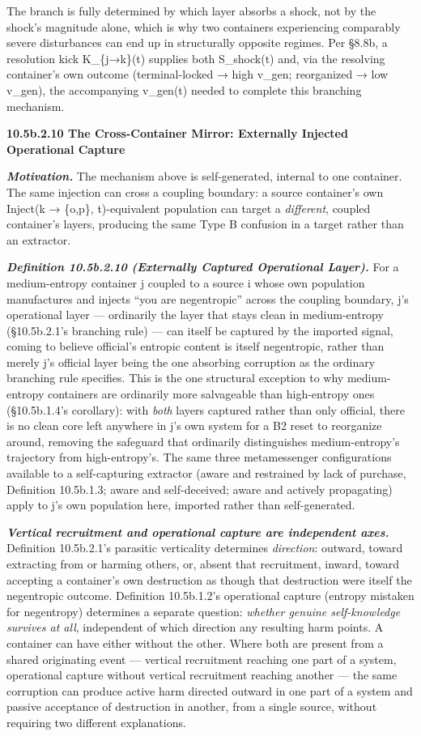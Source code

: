 \documentclass[
]{article}
\begin{document}
The branch is fully determined by which layer absorbs a shock, not by
the shock's magnitude alone, which is why two containers experiencing
comparably severe disturbances can end up in structurally opposite
regimes. Per §8.8b, a resolution kick K\_\{j→k\}(t) supplies both
S\_shock(t) and, via the resolving container's own outcome
(terminal-locked → high v\_gen; reorganized → low v\_gen), the
accompanying v\_gen(t) needed to complete this branching mechanism.

\textbf{10.5b.2.10 The Cross-Container Mirror: Externally Injected
Operational Capture}

\emph{\textbf{Motivation.}} The mechanism above is self-generated,
internal to one container. The same injection can cross a coupling
boundary: a source container's own Inject(k → \{o,p\}, t)-equivalent
population can target a \emph{different}, coupled container's layers,
producing the same Type B confusion in a target rather than an
extractor.

\emph{\textbf{Definition 10.5b.2.10 (Externally Captured Operational
Layer).}} For a medium-entropy container j coupled to a source i whose
own population manufactures and injects ``you are negentropic'' across
the coupling boundary, j's operational layer --- ordinarily the layer
that stays clean in medium-entropy (§10.5b.2.1's branching rule) --- can
itself be captured by the imported signal, coming to believe official's
entropic content is itself negentropic, rather than merely j's official
layer being the one absorbing corruption as the ordinary branching rule
specifies. This is the one structural exception to why medium-entropy
containers are ordinarily more salvageable than high-entropy ones
(§10.5b.1.4's corollary): with \emph{both} layers captured rather than
only official, there is no clean core left anywhere in j's own system
for a B2 reset to reorganize around, removing the safeguard that
ordinarily distinguishes medium-entropy's trajectory from
high-entropy's. The same three metamessenger configurations available to
a self-capturing extractor (aware and restrained by lack of purchase,
Definition 10.5b.1.3; aware and self-deceived; aware and actively
propagating) apply to j's own population here, imported rather than
self-generated.

\emph{\textbf{Vertical recruitment and operational capture are
independent axes.}} Definition 10.5b.2.1's parasitic verticality
determines \emph{direction}: outward, toward extracting from or harming
others, or, absent that recruitment, inward, toward accepting a
container's own destruction as though that destruction were itself the
negentropic outcome. Definition 10.5b.1.2's operational capture (entropy
mistaken for negentropy) determines a separate question: \emph{whether
genuine self-knowledge survives at all}, independent of which direction
any resulting harm points. A container can have either without the
other. Where both are present from a shared originating event ---
vertical recruitment reaching one part of a system, operational capture
without vertical recruitment reaching another --- the same corruption
can produce active harm directed outward in one part of a system and
passive acceptance of destruction in another, from a single source,
without requiring two different explanations.
\end{document}
